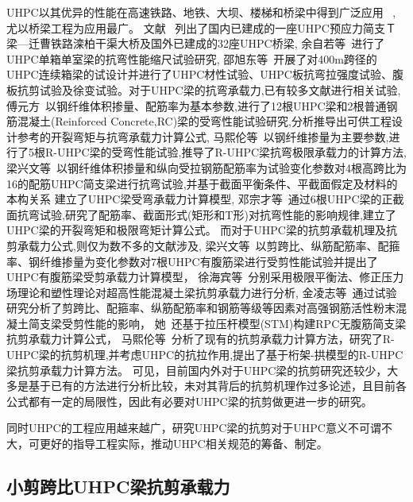 \documentclass[a4paper,11pt]{article}
\begin{document}
\begin{mybox}
\indent UHPC以其优异的性能在高速铁路、地铁、大坝、楼梯和桥梁中得到广泛应用
~\cite{王德辉2016超高性能混凝土在中国的研究和应用},尤以桥梁工程为应用最广。
文献~\parencite{杜任远2013活性粉末混凝土桥梁应用与研究}
列出了国内已建成的一座UHPC预应力简支Ｔ梁---迁曹铁路滦柏干渠大桥及国外已建成的32座UHPC桥梁,
余自若等~\cite{余自若2004铁路}进行了UHPC单箱单室梁的抗弯性能缩尺试验研究,
邵旭东等~\cite{邵旭东2013超大跨径单向预应力}开展了对400m跨径的UHPC连续箱梁的试设计并进行了UHPC材性试验、UHPC板抗弯拉强度试验、腹板抗剪试验及徐变试验。对于UHPC梁的抗弯承载力,已有较多文献进行相关试验,
傅元方~\cite{傅元方2016UHPC}以钢纤维体积掺量、配筋率为基本参数,进行了12根UHPC梁和2根普通钢筋混凝土(Reinforced Concrete,RC)梁的受弯性能试验研究,分析推导出可供工程设计参考的开裂弯矩与抗弯承载力计算公式,
马熙伦等~\cite{2019钢纤维掺量对}以钢纤维掺量为主要参数,进行了5根R-UHPC梁的受弯性能试验,推导了R-UHPC梁抗弯极限承载力的计算方法,
梁兴文等~\cite{2019配筋超高性能混凝土梁受弯性能及承载力研究}以钢纤维体积掺量和纵向受拉钢筋配筋率为试验变化参数对4根高跨比为16的配筋UHPC简支梁进行抗弯试验,并基于截面平衡条件、平截面假定及材料的本构关系
建立了UHPC梁受弯承载力计算模型,
邓宗才等~\cite{邓宗才2015高强钢筋}通过6根UHPC梁的正截面抗弯试验,研究了配筋率、截面形式(矩形和T形)对抗弯性能的影响规律,建立了UHPC梁的开裂弯矩和极限弯矩计算公式。
而对于UHPC梁的抗剪承载机理及抗剪承载力公式,则仅为数不多的文献涉及,
梁兴文等~\cite{2018超高性能混凝土有腹筋梁受剪性能及受剪承载力研究}以剪跨比、纵筋配筋率、配箍率、钢纤维掺量为变化参数对7根UHPC有腹筋梁进行受剪性能试验并提出了UHPC有腹筋梁受剪承载力计算模型，
徐海宾等~\cite{徐海宾2015超高性能混凝土梁抗剪承载力计算方法}分别采用极限平衡法、修正压力场理论和塑性理论对超高性能混凝土梁抗剪承载力进行分析,
金凌志等~\cite{金凌志2013高强钢筋活性粉末混凝土简支梁受剪性能试验研究}通过试验研究分析了剪跨比、配箍率、纵筋配筋率和钢筋等级等因素对高强钢筋活性粉末混凝土简支梁受剪性能的影响，
她~\cite{金凌志2015拉}还基于拉压杆模型(STM)构建RPC无腹筋简支梁抗剪承载力计算公式，
马熙伦等~\cite{马熙伦2017r}分析了现有的抗剪承载力计算方法，研究了R-UHPC梁的抗剪机理,并考虑UHPC的抗拉作用,提出了基于桁架-拱模型的R-UHPC梁抗剪承载力计算方法。
可见，目前国内外对于UHPC梁的抗剪研究还较少，大多是基于已有的方法进行分析比较，未对其背后的抗剪机理作过多论述，且目前各公式都有一定的局限性，因此有必要对UHPC梁的抗剪做更进一步的研究。

\indent 同时UHPC的工程应用越来越广，研究UHPC梁的抗剪对于UHPC意义不可谓不大，可更好的指导工程实际，推动UHPC相关规范的筹备、制定。

\subsection{小剪跨比UHPC梁抗剪承载力}


\end{mybox}
\end{document}
